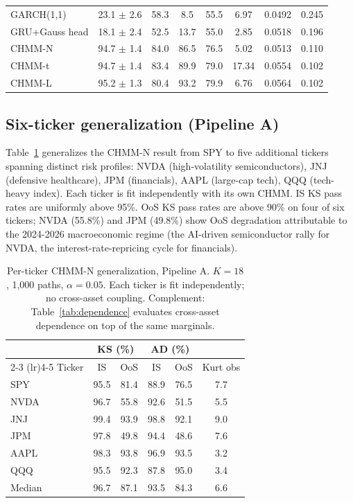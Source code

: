 \documentclass[sigconf,anonymous,nonacm=true]{acmart}
\begin{document}
\begin{table}[t]
\begin{tabular}{l cc cc c c c}
GARCH(1,1)        & 23.1 $\pm$ 2.6 & 58.3 & 8.5  & 55.5 & 6.97  & 0.0492 & 0.245 \\
GRU+Gauss head    & 18.1 $\pm$ 2.4 & 52.5 & 13.7 & 55.0 & 2.85  & 0.0518 & 0.196 \\
CHMM-N            & 94.7 $\pm$ 1.4 & 84.0 & 86.5 & 76.5 & 5.02  & 0.0513 & 0.110 \\
CHMM-t            & 94.7 $\pm$ 1.4 & 83.4 & 89.9 & 79.0 & 17.34 & 0.0554 & 0.102 \\
CHMM-L            & 95.2 $\pm$ 1.3 & 80.4 & 93.2 & 79.9 & 6.76  & 0.0564 & 0.102 \\
\bottomrule
\end{tabular}
\end{table}

\subsection{Six-ticker generalization (Pipeline A)}

Table~\ref{tab:six_ticker} generalizes the CHMM-N result from SPY to
five additional tickers spanning distinct risk profiles: NVDA
(high-volatility semiconductors), JNJ (defensive healthcare), JPM
(financials), AAPL (large-cap tech), QQQ (tech-heavy index). Each
ticker is fit independently with its own CHMM. IS KS pass rates are
uniformly above 95\%. OoS KS pass rates are above 90\% on four of six
tickers; NVDA (55.8\%) and JPM (49.8\%) show OoS degradation
attributable to the 2024-2026 macroeconomic regime (the AI-driven
semiconductor rally for NVDA, the interest-rate-repricing cycle for
financials).

\begin{table}[t]
\centering
\small
\caption{Per-ticker CHMM-N generalization, Pipeline A. $K = 18$,
1{,}000 paths, $\alpha = 0.05$. Each ticker is fit independently; no
cross-asset coupling. Complement: Table~\ref{tab:dependence} evaluates
cross-asset dependence on top of the same marginals.}
\label{tab:six_ticker}
\begin{tabular}{l cc cc c}
\toprule
 & \multicolumn{2}{c}{KS (\%)} & \multicolumn{2}{c}{AD (\%)} & \\
\cmidrule(lr){2-3} \cmidrule(lr){4-5}
Ticker & IS & OoS & IS & OoS & Kurt obs \\
\midrule
SPY    & 95.5 & 81.4 & 88.9 & 76.5 & 7.7 \\
NVDA   & 96.7 & 55.8 & 92.6 & 51.5 & 5.5 \\
JNJ    & 99.4 & 93.9 & 98.8 & 92.1 & 9.0 \\
JPM    & 97.8 & 49.8 & 94.4 & 48.6 & 7.6 \\
AAPL   & 98.3 & 93.8 & 96.9 & 93.5 & 3.2 \\
QQQ    & 95.5 & 92.3 & 87.8 & 95.0 & 3.4 \\
\midrule
Median & 96.7 & 87.1 & 93.5 & 84.3 & 6.6 \\
\bottomrule
\end{tabular}
\end{table}
\end{document}
